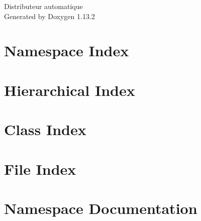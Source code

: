 \documentclass[twoside]{book}
\newcommand{\+}{\discretionary{\mbox{\scriptsize$\hookleftarrow$}}{}{}}
\newcommand{\clearemptydoublepage}{%
    \newpage{\pagestyle{empty}\cleardoublepage}%
  }
\begin{document}
  \raggedbottom
    \hypersetup{pageanchor=false,
                bookmarksnumbered=true,
                pdfencoding=unicode
               }
  \begin{titlepage}
  \vspace*{7cm}
  \begin{center}%
  {\Large Distributeur automatique}\\
  \vspace*{1cm}
  {\large Generated by Doxygen 1.13.2}\\
  \end{center}
  \end{titlepage}
  \clearemptydoublepage
  \tableofcontents
  \clearemptydoublepage
  \hypersetup{pageanchor=true}
\chapter{Namespace Index}

\chapter{Hierarchical Index}

\chapter{Class Index}

\chapter{File Index}

\chapter{Namespace Documentation}
















\end{document}
